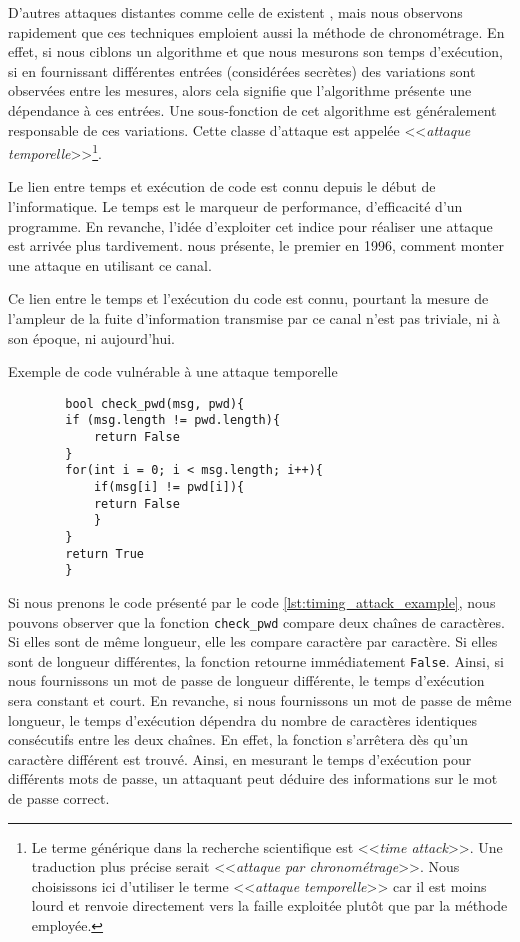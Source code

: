 D'autres attaques distantes comme celle de \citeauthor{LLC_attack} existent \cite{cryptoeprint:2016/224,Moghimi_2017,vanbulck2018nemesis}, mais nous observons rapidement que ces techniques emploient aussi la méthode de chronométrage. En effet, si nous ciblons un algorithme et que nous mesurons son temps d'exécution, si en fournissant différentes entrées (considérées secrètes) des variations sont observées entre les mesures, alors cela signifie que l'algorithme présente une dépendance à ces entrées. Une sous-fonction de cet algorithme est généralement responsable de ces variations. Cette classe d'attaque est appelée <<\textit{attaque temporelle}>>\footnote{Le terme générique dans la recherche scientifique est <<\textit{time attack}>>. Une traduction plus précise serait <<\textit{attaque par chronométrage}>>. Nous choisissons ici d'utiliser le terme <<\textit{attaque temporelle}>> car il est moins lourd et renvoie directement vers la faille exploitée plutôt que par la méthode employée.}.\medbreak

Le lien entre temps et exécution de code est connu depuis le début de l'informatique. Le temps est le marqueur de performance, d'efficacité d'un programme. En revanche, l'idée d'exploiter cet indice pour réaliser une attaque est arrivée plus tardivement. \citeauthor{crypto-1996-1469} nous présente, le premier en 1996, comment monter une attaque en utilisant ce canal.\medbreak

Ce lien entre le temps et l'exécution du code est connu, pourtant la mesure de l'ampleur de la fuite d'information transmise par ce canal n'est pas triviale, ni à son époque, ni aujourd'hui.

\begin{listing}[!ht]
    \caption{Exemple de code vulnérable à une attaque temporelle}
    \label{lst:timing_attack_example}
    \begin{verbatim}
        bool check_pwd(msg, pwd){
        if (msg.length != pwd.length){
            return False
        }
        for(int i = 0; i < msg.length; i++){
            if(msg[i] != pwd[i]){
            return False
            }
        }
        return True
        }
    \end{verbatim}
\end{listing}
                
Si nous prenons le code présenté par le code \ref{lst:timing_attack_example}, nous pouvons observer que la fonction \texttt{check\_pwd} compare deux chaînes de caractères. Si elles sont de même longueur, elle les compare caractère par caractère. Si elles sont de longueur différentes, la fonction retourne immédiatement \texttt{False}. Ainsi, si nous fournissons un mot de passe de longueur différente, le temps d'exécution sera constant et court. En revanche, si nous fournissons un mot de passe de même longueur, le temps d'exécution dépendra du nombre de caractères identiques consécutifs entre les deux chaînes. En effet, la fonction s'arrêtera dès qu'un caractère différent est trouvé. Ainsi, en mesurant le temps d'exécution pour différents mots de passe, un attaquant peut déduire des informations sur le mot de passe correct.\medbreak

